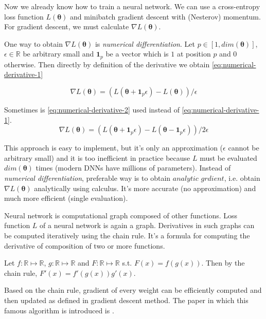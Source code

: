 Now we already know how to train a neural network. We can use a cross-entropy loss function $L (\pmb \theta)$ and minibatch gradient descent with (Nesterov) momentum. For gradient descent, we must calculate $\nabla L (\pmb \theta)$.

One way to obtain $\nabla L (\pmb \theta)$ is \textit{numerical differentiation}. 
Let $p \in [1, dim(\pmb \theta)]$, $\epsilon \in \mathbb{R}$ be arbitrary small and $\pmb 1_p$ be a vector which is $1$ at position $p$ and $0$ otherwise. Then directly by definition of the derivative we obtain \ref{eq:numerical-derivative-1}

\begin{equation}\label{eq:numerical-derivative-1}
\nabla L (\pmb \theta) = (L(\pmb \theta + \pmb 1_p \epsilon) - L (\pmb \theta)) / \epsilon
\end{equation}

Sometimes is \ref{eq:numerical-derivative-2} used instead of \ref{eq:numerical-derivative-1}.
\begin{equation}\label{eq:numerical-derivative-2}
\nabla L (\pmb \theta) = (L(\pmb \theta + \pmb 1_p \epsilon) - L (\pmb \theta - \pmb 1_p \epsilon)) / 2 \epsilon
\end{equation}

This approach is easy to implement, but it's only an approximation ($\epsilon$ cannot be arbitrary small) and it is too inefficient in practice because $L$ must be evaluated $dim(\pmb\theta)$ times (modern DNNs have millions of parameters). Instead of \textit{numerical differentiation}, preferable way is to obtain $\textit{analytic grdient}$, i.e. obtain $\nabla L (\pmb \theta)$ analytically using calculus. It's more accurate (no approximation) and much more efficient (single evaluation).


Neural network is computational graph composed of other functions. Loss function $L$ of a neural network is again a graph. Derivatives in such graphs can be computed iteratively using the chain rule. It's a formula for computing the derivative of composition of two or more functions. 

Let $f: \mathbb{R} \mapsto \mathbb{R}$, $g: \mathbb{R} \mapsto \mathbb{R}$ and $F: \mathbb{R} \mapsto \mathbb{R}$ s.t. $F(x) = f(g(x))$. Then by the chain rule, $F'(x) = f'(g(x))g'(x)$.

Based on the chain rule, gradient of every weight can be efficiently computed and then updated as defined in gradient descent method. The paper in which this famous algorithm is introduced is \cite{Rumelhart:1986:LIR:104279.104293}.